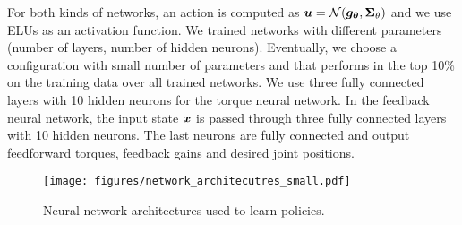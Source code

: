 For both kinds of networks, an action is computed as $\bm{u}=\mathcal{N}(\bm{g_\theta},\bm{\Sigma}_\theta)$ and we use ELUs as an activation function. We trained networks with different parameters (number of layers, number of hidden neurons). Eventually, we choose a configuration with small number of parameters and that performs in the top 10\% on the training data over all trained networks. We use three fully connected layers with 10 hidden neurons for the torque neural network.
In the feedback neural network, the input state $\bm{x}$ is passed through three fully connected layers with 10 hidden neurons. The last neurons are fully connected and output feedforward torques, feedback gains and desired joint positions.
\begin{figure}[t]
  \centering
  \vspace{0.2cm}
  \texttt{[image: figures/network\_architecutres\_small.pdf]}
  \caption{Neural network architectures used to learn policies.
  }
  \label{fig:network_overview}
  \vspace{-0.5cm}
\end{figure}
%
%
%

